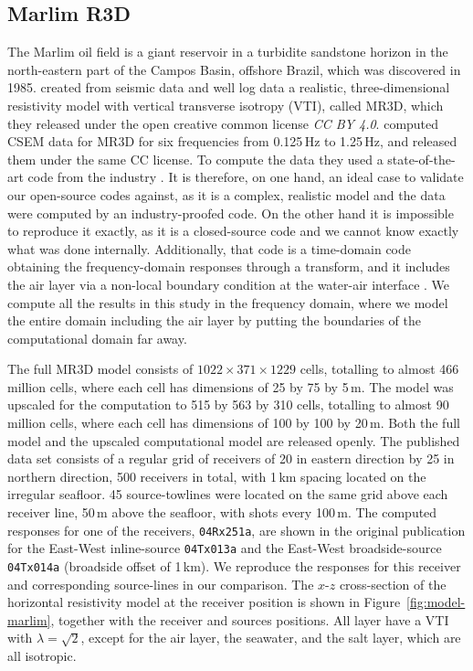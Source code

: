 \documentclass[
    paper,
  ]{geophysics}
\begin{document}
\subsection{Marlim R3D}

The Marlim oil field is a giant reservoir in a turbidite sandstone horizon in the north-eastern part of the Campos Basin, offshore Brazil, which was discovered in 1985. \cite{BJG.17.Carvalho} created from seismic data and well log data a realistic, three-dimensional resistivity model with vertical transverse isotropy (VTI), called MR3D, which they released under the open creative common license \emph{CC BY 4.0}. \cite{GEO.19.Correa} computed CSEM data for MR3D for six frequencies from 0.125\,Hz to 1.25\,Hz, and released them under the same CC license. To compute the data they used a state-of-the-art code from the industry \citep[][ \emph{SBLwiz} software from \emph{EMGS}]{GEO.07.Maao}. It is therefore, on one hand, an ideal case to validate our open-source codes against, as it is a complex, realistic model and the data were computed by an industry-proofed code. On the other hand it is impossible to reproduce it exactly, as it is a closed-source code and we cannot know exactly what was done internally. Additionally, that code is a time-domain code obtaining the frequency-domain responses through a transform, and it includes the air layer via a non-local boundary condition at the water-air interface \citep{GEO.10.Mittet}. We compute all the results in this study in the frequency domain, where we model the entire domain including the air layer by putting the boundaries of the computational domain far away.

The full MR3D model consists of $1022 \times 371 \times 1229$ cells, totalling to almost 466 million cells, where each cell has dimensions of 25 by 75 by 5\,m. The model was upscaled for the computation to 515 by 563 by 310 cells, totalling to almost 90 million cells, where each cell has dimensions of 100 by 100 by 20\,m. Both the full model and the upscaled computational model are released openly. The published data set consists of a regular grid of receivers of 20 in eastern direction by 25 in northern direction, 500 receivers in total, with 1\,km spacing located on the irregular seafloor. 45 source-towlines were located on the same grid above each receiver line, 50\,m above the seafloor, with shots every 100\,m. The computed responses for one of the receivers, \texttt{04Rx251a}, are shown in the original publication for the East-West inline-source \texttt{04Tx013a} and the East-West broadside-source \texttt{04Tx014a} (broadside offset of 1\,km). We reproduce the responses for this receiver and corresponding source-lines in our comparison. The $x$-$z$ cross-section of the horizontal resistivity model at the receiver position is shown in Figure~\ref{fig:model-marlim}, together with the receiver and sources positions. All layer have a VTI with $\lambda=\sqrt{2}$, except for the air layer, the seawater, and the salt layer, which are all isotropic.
\end{document}
